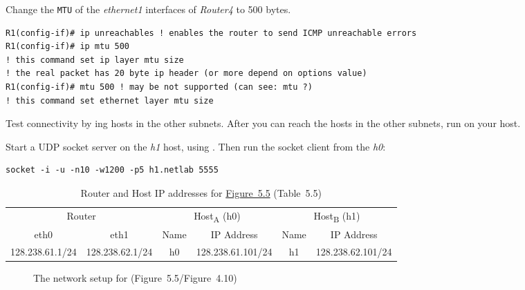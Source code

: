 \documentclass{../UTNetLab}
\begin{document}

Change the \texttt{MTU} of the \textit{ethernet1} interfaces of \textit{Router4} to 500 bytes.
\begin{lstlisting}[language={cisco}]
R1(config-if)# ip unreachables ! enables the router to send ICMP unreachable errors
R1(config-if)# ip mtu 500
! this command set ip layer mtu size
! the real packet has 20 byte ip header (or more depend on options value)
R1(config-if)# mtu 500 ! may be not supported (can see: mtu ?)
! this command set ethernet layer mtu size
    \end{lstlisting}

Test connectivity by ing hosts in the other subnets.
After you can reach the
hosts in the other subnets, run  on your host.

Start a UDP socket server on the \textit{h1} host, using .
Then run the socket client from the \textit{h0}:
\begin{lstlisting}[emph={h1,netlab}]
socket -i -u -n10 -w1200 -p5 h1.netlab 5555
    \end{lstlisting}

\begin{table}[H]
    \caption{Router and Host IP addresses for \hyperref[fig:5.5]{Figure~5.5} (Table~5.5)}
    \centering
    \begin{tabular}{ *2c|*2c|*2c }
        \hline \hline
        \multicolumn{2}{c|}{Router} & \multicolumn{2}{c|}{Host\textsubscript{A} (h0)} & \multicolumn{2}{c}{Host\textsubscript{B} (h1)}                                                \\
        eth0                        & eth1                                            & Name                                           & IP Address        & Name & IP Address        \\
        \hline
        128.238.61.1/24             & 128.238.62.1/24                                 & h0                                             & 128.238.61.101/24 & h1   & 128.238.62.101/24 \\
        \hline \hline
    \end{tabular}
\end{table}

\begin{figure}[H]
    \centering
    \caption{The network setup for  (Figure~5.5/Figure~4.10)}
    \label{fig:5.5}
\end{figure}
\end{document}
